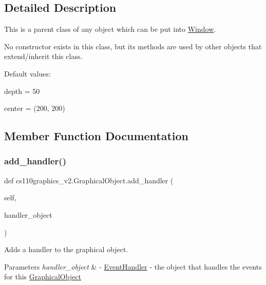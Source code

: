 \subsection{Detailed Description}
This is a parent class of any object which can be put into \mbox{\hyperlink{classcs110graphics__v2_1_1Window}{Window}}. 

No constructor exists in this class, but its methods are used by other objects that extend/inherit this class.

Default values\+:
\begin{DoxyItemize}
\item depth = 50
\item center = (200, 200) 
\end{DoxyItemize}

\subsection{Member Function Documentation}
\mbox{\label{classcs110graphics__v2_1_1GraphicalObject_a71b14f3ad9ad0d345f6ca0d62c4b7a5a}} 
\subsubsection{\texorpdfstring{add\_handler()}{add\_handler()}}
{\footnotesize\ttfamily def cs110graphics\+\_\+v2.\+Graphical\+Object.\+add\+\_\+handler (\begin{DoxyParamCaption}\item[{}]{self,  }\item[{}]{handler\+\_\+object }\end{DoxyParamCaption})}



Adds a handler to the graphical object. 


\begin{DoxyParams}{Parameters}
{\em handler\+\_\+object} & -\/ \mbox{\hyperlink{classcs110graphics__v2_1_1EventHandler}{Event\+Handler}} -\/ the object that handles the events for this \mbox{\hyperlink{classcs110graphics__v2_1_1GraphicalObject}{Graphical\+Object}} \\
\hline
\end{DoxyParams}
\mbox{\label{classcs110graphics__v2_1_1GraphicalObject_aa4877c0022307a12b89f5ab25f332c08}} 
